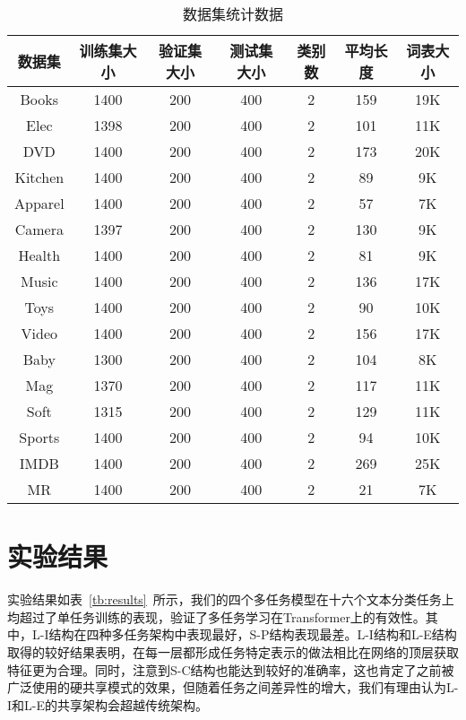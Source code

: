 \begin{table}[htb]
	\centering
	\caption{数据集统计数据}
	\begin{tabular}{ccccccc}
		\toprule[2pt]
		数据集&训练集大小&验证集大小&测试集大小&类别数&平均长度&词表大小\\
		\midrule[1pt]
		Books& 1400& 200& 400& 2& 159& 19K\\
		Elec& 1398& 200& 400& 2& 101& 11K\\
		DVD& 1400& 200& 400& 2& 173& 20K\\
		Kitchen& 1400& 200& 400& 2& 89& 9K\\
		Apparel& 1400& 200& 400& 2& 57& 7K\\
		Camera& 1397& 200& 400& 2& 130& 9K\\
		Health& 1400& 200& 400& 2& 81& 9K\\
		Music& 1400& 200& 400& 2& 136& 17K\\
		Toys& 1400& 200& 400& 2& 90& 10K\\
		Video& 1400& 200& 400& 2& 156& 17K\\
		Baby& 1300& 200& 400& 2& 104& 8K\\
		Mag& 1370& 200& 400& 2& 117& 11K\\
		Soft& 1315& 200& 400& 2& 129& 11K\\
		Sports& 1400& 200& 400& 2& 94& 10K\\
		IMDB& 1400& 200& 400& 2& 269& 25K\\
		MR& 1400& 200& 400& 2& 21& 7K\\
		\bottomrule[2pt]
	\end{tabular}
	\label{tb:dataset}
\end{table}

\section{实验结果}
\label{sec:results}
实验结果如表~\ref{tb:results}~所示，我们的四个多任务模型在十六个文本分类任务上均超过了单任务训练的表现，验证了多任务学习在Transformer上的有效性。其中，L-I结构在四种多任务架构中表现最好，S-P结构表现最差。L-I结构和L-E结构取得的较好结果表明，在每一层都形成任务特定表示的做法相比在网络的顶层获取特征更为合理。同时，注意到S-C结构也能达到较好的准确率，这也肯定了之前被广泛使用的硬共享模式的效果，但随着任务之间差异性的增大，我们有理由认为L-I和L-E的共享架构会超越传统架构。

